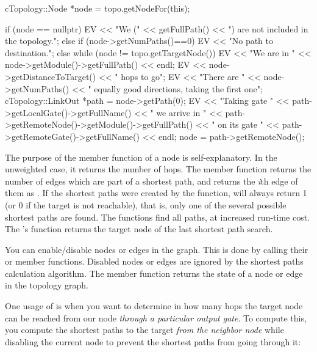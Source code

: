 \begin{cpp}
cTopology::Node *node = topo.getNodeFor(this);

if (node == nullptr) {
  EV << "We (" << getFullPath() << ") are not included in the topology.\n";
}
else if (node->getNumPaths()==0) {
  EV << "No path to destination.\n";
}
else {
  while (node != topo.getTargetNode()) {
    EV << "We are in " << node->getModule()->getFullPath() << endl;
    EV << node->getDistanceToTarget() << " hops to go\n";
    EV << "There are " << node->getNumPaths()
       << " equally good directions, taking the first one\n";
    cTopology::LinkOut *path = node->getPath(0);
    EV << "Taking gate " << path->getLocalGate()->getFullName()
       << " we arrive in " << path->getRemoteNode()->getModule()->getFullPath()
       << " on its gate " << path->getRemoteGate()->getFullName() << endl;
    node = path->getRemoteNode();
  }
}
\end{cpp}

The purpose of the  member function of a
node is self-explanatory. In the unweighted case, it returns the
number of hops. The  member function returns the number
of edges which are part of a shortest path, and
 returns the \textit{i}th edge of them as
. If the shortest paths were created by the
 function,
 will always return 1 (or 0 if the target is not
reachable), that is, only one of the several possible shortest paths
are found.  The
 functions
find all paths, at increased run-time cost. The 's
 function returns the target node of the last
shortest path search.

You can enable/disable nodes or edges in the graph. This is done by
calling their  or  member functions.
Disabled nodes or edges are ignored by the shortest paths calculation
algorithm. The  member function returns the state of
a node or edge in the topology graph.

One usage of  is when you want to determine in how many
hops the target node can be reached from our node \textit{through
a particular output gate}. To compute this, you compute the
shortest paths to the target \textit{from the neighbor node} while
disabling the current node to prevent the shortest paths
from going through it:

